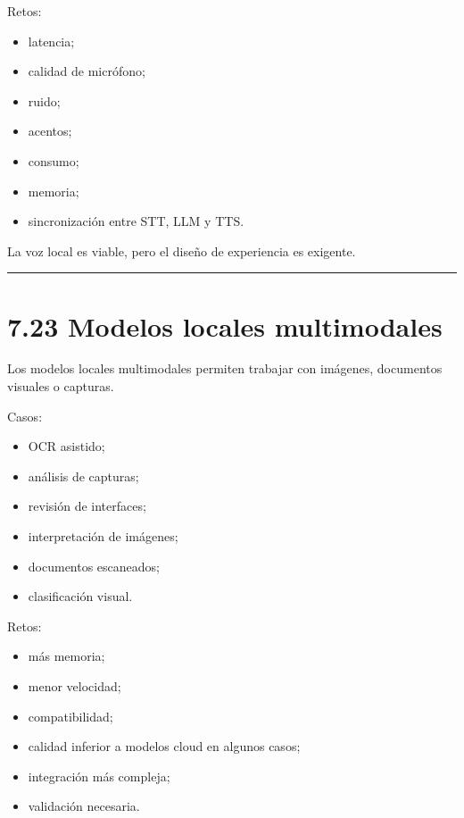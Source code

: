 Retos:

\begin{itemize}
\tightlist
\item
  latencia;
\item
  calidad de micrófono;
\item
  ruido;
\item
  acentos;
\item
  consumo;
\item
  memoria;
\item
  sincronización entre STT, LLM y TTS.
\end{itemize}

La voz local es viable, pero el diseño de experiencia es exigente.

\begin{center}\rule{0.5\linewidth}{0.5pt}\end{center}

\section{7.23 Modelos locales
multimodales}\label{modelos-locales-multimodales}

Los modelos locales multimodales permiten trabajar con imágenes,
documentos visuales o capturas.

Casos:

\begin{itemize}
\tightlist
\item
  OCR asistido;
\item
  análisis de capturas;
\item
  revisión de interfaces;
\item
  interpretación de imágenes;
\item
  documentos escaneados;
\item
  clasificación visual.
\end{itemize}

Retos:

\begin{itemize}
\tightlist
\item
  más memoria;
\item
  menor velocidad;
\item
  compatibilidad;
\item
  calidad inferior a modelos cloud en algunos casos;
\item
  integración más compleja;
\item
  validación necesaria.
\end{itemize}

